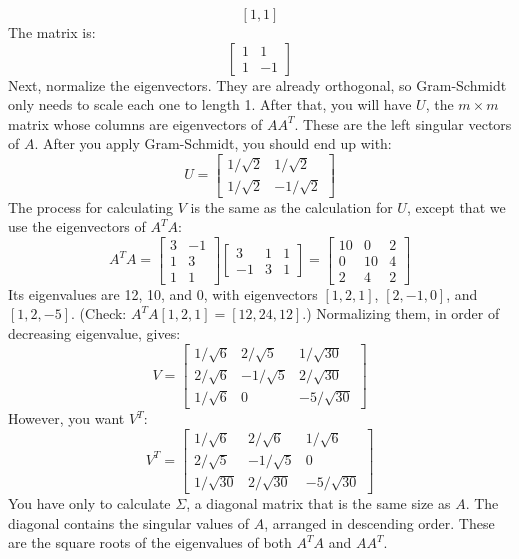 $$\left[ 1,1 \right]$$
The matrix is:
$$
\begin{bmatrix}
1 & 1 \\
1 & -1 
\end{bmatrix}
$$
Next, normalize the eigenvectors. They are already orthogonal, so Gram-Schmidt only needs to scale each one to length 1. After that, you will have $U$, the $m \times m$ matrix whose columns are eigenvectors of $AA^T$. These are the left singular vectors of $A$. After you apply Gram-Schmidt, you should end up with:
$$
U = \begin{bmatrix}
1/\sqrt{2} & 1/\sqrt{2} \\
1/\sqrt{2} & -1/\sqrt{2} 
\end{bmatrix}
$$
The process for calculating $V$ is the same as the calculation for $U$, except that we use the eigenvectors of $A^TA$:
$$A^TA = 
\begin{bmatrix}
3 & -1\\
1 & 3\\
1 & 1
\end{bmatrix}
\begin{bmatrix}
3 & 1 & 1\\
-1 & 3 & 1
\end{bmatrix}
=
\begin{bmatrix}
10 & 0 & 2 \\
0 & 10 & 4 \\
2 & 4 & 2
\end{bmatrix}
$$
Its eigenvalues are 12, 10, and 0, with eigenvectors $[1, 2, 1]$, $[2, -1, 0]$, and $[1, 2, -5]$. (Check: $A^TA [1, 2, 1] = [12, 24, 12]$.) Normalizing them, in order of decreasing eigenvalue, gives:
$$
V = \begin{bmatrix}
1/\sqrt{6} & 2/\sqrt{5} & 1/\sqrt{30} \\
2/\sqrt{6} & -1/\sqrt{5} & 2/\sqrt{30}\\
1/\sqrt{6} & 0 & -5/\sqrt{30}
\end{bmatrix}
$$
However, you want $V^T$:
$$
V^T =
\begin{bmatrix}
1/\sqrt{6} & 2/\sqrt{6} & 1/\sqrt{6} \\
2/\sqrt{5} & -1/\sqrt{5} & 0\\
1/\sqrt{30} & 2/\sqrt{30} & -5/\sqrt{30}
\end{bmatrix}
$$
You have only to calculate $\Sigma$, a diagonal matrix that is the same size as $A$. The diagonal contains the singular values of $A$, arranged in descending order. These are the square roots of the eigenvalues of both $A^TA$ and $AA^T$.

